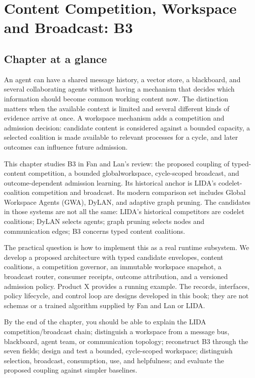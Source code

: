 \chapter{Content Competition, Workspace and Broadcast: B3}
\label{ch:b3-workspace}

\section*{Chapter at a glance}

An agent can have a shared message history, a vector store, a blackboard, and several collaborating agents without having a mechanism that decides which information should become common working content now. The distinction matters when the available context is limited and several different kinds of evidence arrive at once. A workspace mechanism adds a competition and admission decision: candidate content is considered against a bounded capacity, a selected coalition is made available to relevant processes for a cycle, and later outcomes can influence future admission.

This chapter studies B3 in Fan and Lan's review: the proposed coupling of typed-content competition, a bounded \gls{globalworkspace}, cycle-scoped \gls{broadcast}, and outcome-dependent admission learning. Its historical anchor is LIDA's codelet-coalition competition and broadcast. Its modern comparison set includes Global Workspace Agents (GWA), DyLAN, and adaptive graph pruning. The candidates in those systems are not all the same: LIDA's historical competitors are codelet coalitions; DyLAN selects agents; graph pruning selects nodes and communication edges; B3 concerns typed content coalitions.

The practical question is how to implement this as a real runtime subsystem. We develop a proposed architecture with typed candidate envelopes, content coalitions, a competition governor, an immutable workspace snapshot, a broadcast router, consumer receipts, outcome attribution, and a versioned admission policy. Product X provides a running example. The records, interfaces, policy lifecycle, and control loop are \EngineeringLabel{} designs developed in this book; they are not schemas or a trained algorithm supplied by Fan and Lan or LIDA.

By the end of the chapter, you should be able to explain the LIDA competition/broadcast chain; distinguish a workspace from a message bus, blackboard, agent team, or communication topology; reconstruct B3 through the seven fields; design and test a bounded, cycle-scoped workspace; distinguish selection, broadcast, consumption, use, and helpfulness; and evaluate the proposed coupling against simpler baselines.

